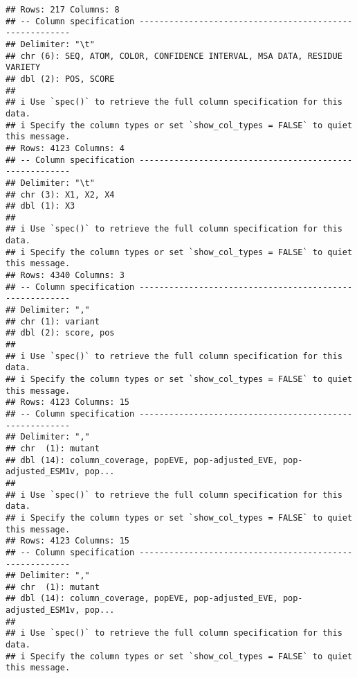\documentclass[
]{article}
\begin{document}
\begin{verbatim}
## Rows: 217 Columns: 8
## -- Column specification --------------------------------------------------------
## Delimiter: "\t"
## chr (6): SEQ, ATOM, COLOR, CONFIDENCE INTERVAL, MSA DATA, RESIDUE VARIETY
## dbl (2): POS, SCORE
## 
## i Use `spec()` to retrieve the full column specification for this data.
## i Specify the column types or set `show_col_types = FALSE` to quiet this message.
## Rows: 4123 Columns: 4
## -- Column specification --------------------------------------------------------
## Delimiter: "\t"
## chr (3): X1, X2, X4
## dbl (1): X3
## 
## i Use `spec()` to retrieve the full column specification for this data.
## i Specify the column types or set `show_col_types = FALSE` to quiet this message.
## Rows: 4340 Columns: 3
## -- Column specification --------------------------------------------------------
## Delimiter: ","
## chr (1): variant
## dbl (2): score, pos
## 
## i Use `spec()` to retrieve the full column specification for this data.
## i Specify the column types or set `show_col_types = FALSE` to quiet this message.
## Rows: 4123 Columns: 15
## -- Column specification --------------------------------------------------------
## Delimiter: ","
## chr  (1): mutant
## dbl (14): column_coverage, popEVE, pop-adjusted_EVE, pop-adjusted_ESM1v, pop...
## 
## i Use `spec()` to retrieve the full column specification for this data.
## i Specify the column types or set `show_col_types = FALSE` to quiet this message.
## Rows: 4123 Columns: 15
## -- Column specification --------------------------------------------------------
## Delimiter: ","
## chr  (1): mutant
## dbl (14): column_coverage, popEVE, pop-adjusted_EVE, pop-adjusted_ESM1v, pop...
## 
## i Use `spec()` to retrieve the full column specification for this data.
## i Specify the column types or set `show_col_types = FALSE` to quiet this message.
\end{verbatim}
\end{document}
